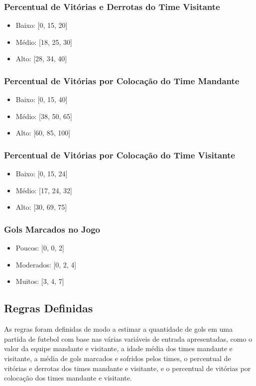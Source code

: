 \documentclass[conference]{IEEEtran}
\begin{document}
\subsubsection{Percentual de Vitórias e Derrotas do Time Visitante}
\begin{itemize}
    \item Baixo: [0, 15, 20]
    \item Médio: [18, 25, 30]
    \item Alto: [28, 34, 40]
\end{itemize}

\subsubsection{Percentual de Vitórias por Colocação do Time Mandante}
\begin{itemize}
    \item Baixo: [0, 15, 40]
    \item Médio: [38, 50, 65]
    \item Alto: [60, 85, 100]
\end{itemize}

\subsubsection{Percentual de Vitórias por Colocação do Time Visitante}
\begin{itemize}
    \item Baixo: [0, 15, 24]
    \item Médio: [17, 24, 32]
    \item Alto: [30, 69, 75]
\end{itemize}

\subsubsection{Gols Marcados no Jogo}
\begin{itemize}
    \item Poucos: [0, 0, 2]
    \item Moderados: [0, 2, 4]
    \item Muitos: [3, 4, 7]
\end{itemize}


\subsection{Regras Definidas}
\indent As regras foram definidas de modo a estimar a quantidade de gols em uma 
partida de futebol com base nas várias variáveis de entrada apresentadas, como 
o valor da equipe mandante e visitante, a idade média dos times mandante e 
visitante, a média de gols marcados e sofridos pelos times, o percentual de 
vitórias e derrotas dos times mandante e visitante, e o percentual de vitórias 
por colocação dos times mandante e visitante.
\end{document}
